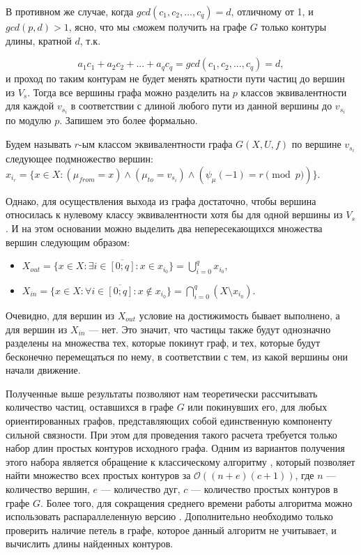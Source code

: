 В противном же случае, когда $gcd(c_1, c_2, ... , c_q) = d$, отличному от 1, и $gcd(p,d) > 1$, ясно, что мы cможем получить на графе $G$ только контуры длины, кратной $d$, т.к. 

\begin{equation*}
a_1c_1 + a_2c_2 + ... + a_qc_q = gcd(c_1, c_2, ... , c_q) = d,
\end{equation*}	и проход по таким контурам не будет менять кратности пути частиц до вершин из $V_s$. Тогда все вершины графа можно разделить на $p$ классов эквивалентности для каждой $v_{s_i}$ в соответствии с длиной любого пути из данной вершины до $v_{s_i}$ по модулю $p$.
Запишем это более формально.

\begin{definition}
	Будем называть $r$-ым классом эквивалентности графа $G(X, U, f)$ по вершине $v_{s_i}$ следующее подмножество вершин: $x_{i_r} = \{x \in X: (\mu_{from} = x) \wedge (\mu_{to} = v_{s_i}) \wedge (\psi_\mu(-1) = r \pmod p) \}$.
\end{definition}

Однако, для осуществления выхода из графа достаточно, чтобы вершина относилась к нулевому классу эквивалентности хотя бы для одной вершины из $V_s$. И на этом основании можно выделить два непересекающихся множества вершин следующим образом:

\begin{itemize}
	\item $X_{out} = \{x \in X: \exists i \in \overline{ [0; q] } : x \in x_{i_0} \} = \bigcup\limits_{i=0}^q x_{i_0}$, 
	\item $X_{in} = \{x \in X: \forall i \in \overline{ [0; q] } : x \notin x_{i_0} \} = \bigcap\limits_{i=0}^q (X \setminus x_{i_0})$.
\end{itemize}

Очевидно, для вершин из $X_{out}$ условие на достижимость бывает выполнено, а для вершин из $X_{in}$ --- нет. Это значит, что частицы также будут однозначно разделены на множества тех, которые покинут граф, и тех, которые будут бесконечно перемещаться по нему, в соответствии с тем, из какой вершины они начали движение. 

Полученные выше результаты позволяют нам теоретически рассчитывать количество частиц, оставшихся в графе $G$ или покинувших его, для любых ориентированных графов, представляющих собой единственную компоненту сильной связности. При этом для проведения такого расчета требуется только набор длин простых контуров исходного графа. Одним из вариантов получения этого набора является обращение к классическому алгоритму \cite{Cir}, который позволяет найти множество всех простых контуров за $\mathcal{O}((n + e)(c + 1))$, где $n$ --- количество вершин, $e$ --- количество дуг, $c$ --- количество простых контуров в графе $G$. Более того, для сокращения среднего времени работы алгоритма можно использовать распараллеленную версию \cite{Par}. Дополнительно необходимо только проверить наличие петель в графе, которое данный алгоритм не учитывает, и вычислить длины найденных контуров. 

